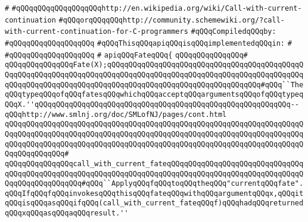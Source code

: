 \verb|#|\newline
\verb|#qQQqqQQqqQQqqQQqqQQqhttp://en.wikipedia.org/wiki/Call-with-current-continuation|\newline
\verb|#qQQqorqQQqqQQqhttp://community.schemewiki.org/?call-with-current-continuation-for-C-programmers|\newline
\newline
\verb|#qQQqCompiledqQQqby:|\newline
\verb|#qQQqqQQqqQQqqQQqqQQq|\newline
\newline
\newline
\newline
\newline
\newline
\verb|#qQQqThisqQQqapiqQQqisqQQqimplementedqQQqin:|\newline
\verb|#|\newline
\verb|#qQQqqQQqqQQqqQQqqQQq|\newline
\verb|#|\newline
\verb|apiqQQqFateqQQq{|\newline
\verb|qQQqqQQqqQQqqQQq#|\newline
\verb|qQQqqQQqqQQqqQQqFate(X);qQQqqQQqqQQqqQQqqQQqqQQqqQQqqQQqqQQqqQQqqQQqqQQqqQQqqQQqqQQqqQQqqQQqqQQqqQQqqQQqqQQqqQQqqQQqqQQqqQQqqQQqqQQqqQQqqQQqqQQqqQQqqQQqqQQqqQQqqQQqqQQqqQQqqQQqqQQqqQQqqQQqqQQqqQQqqQQq#qQQq``TheqQQqtypeqQQqofqQQqfatesqQQqwhichqQQqacceptqQQqargumentsqQQqofqQQqtypeqQQqX.''qQQqqQQqqQQqqQQqqQQqqQQqqQQqqQQqqQQqqQQqqQQqqQQqqQQqqQQqqQQq--qQQqhttp://www.smlnj.org/doc/SMLofNJ/pages/cont.html|\newline
\verb|qQQqqQQqqQQqqQQqqQQqqQQqqQQqqQQqqQQqqQQqqQQqqQQqqQQqqQQqqQQqqQQqqQQqqQQqqQQqqQQqqQQqqQQqqQQqqQQqqQQqqQQqqQQqqQQqqQQqqQQqqQQqqQQqqQQqqQQqqQQqqQQqqQQqqQQqqQQqqQQqqQQqqQQqqQQqqQQqqQQqqQQqqQQqqQQqqQQqqQQqqQQqqQQqqQQqqQQqqQQqqQQq#|\newline
\newline
\verb|qQQqqQQqqQQqqQQqcall_with_current_fateqQQqqQQqqQQqqQQqqQQqqQQqqQQqqQQqqQQqqQQqqQQqqQQqqQQqqQQqqQQqqQQqqQQqqQQqqQQqqQQqqQQqqQQqqQQqqQQqqQQqqQQqqQQqqQQqqQQqqQQq#qQQq``ApplyqQQqfqQQqtoqQQqtheqQQq"currentqQQqfate".qQQqIfqQQqfqQQqinvokesqQQqthisqQQqfateqQQqwithqQQqargumentqQQqx,qQQqitqQQqisqQQqasqQQqifqQQq(call_with_current_fateqQQqf)qQQqhadqQQqreturnedqQQqxqQQqasqQQqaqQQqresult.''|\newline
